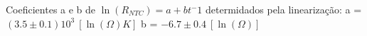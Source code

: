 
Coeficientes a e b de $\ln(R_{NTC}) = a + b t^-1$ determidados pela linearização:
a = $(3.5 \pm 0.1)10^3\ [\ln(\Omega) K]$
b = $-6.7 \pm 0.4\ [\ln(\Omega)]$
